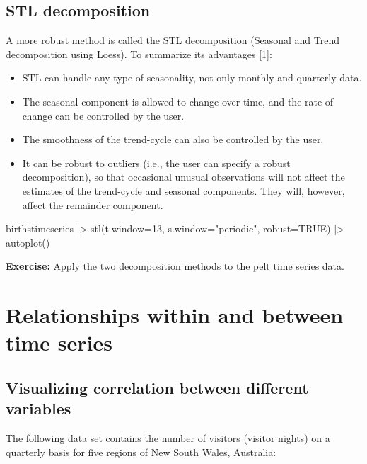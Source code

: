 \documentclass[
  letterpaper,
  DIV=11,
  numbers=noendperiod]{scrreprt}
\newenvironment{Shaded}{\begin{snugshade}}{\end{snugshade}}
\newcommand{\NormalTok}[1]{\textcolor[rgb]{0.00,0.23,0.31}{#1}}
\providecommand{\tightlist}{%
  \setlength{\itemsep}{0pt}\setlength{\parskip}{0pt}}\usepackage{longtable,booktabs,array}
\begin{document}
\subsection{STL decomposition}\label{stl-decomposition}

A more robust method is called the STL decomposition (Seasonal and Trend
decomposition using Loess). To summarize its advantages {[}1{]}:

\begin{itemize}
\tightlist
\item
  STL can handle any type of seasonality, not only monthly and quarterly
  data.
\item
  The seasonal component is allowed to change over time, and the rate of
  change can be controlled by the user.
\item
  The smoothness of the trend-cycle can also be controlled by the user.
\item
  It can be robust to outliers (i.e., the user can specify a robust
  decomposition), so that occasional unusual observations will not
  affect the estimates of the trend-cycle and seasonal components. They
  will, however, affect the remainder component.
\end{itemize}

\begin{Shaded}
\begin{Highlighting}[]
\NormalTok{birthstimeseries |\textgreater{}  stl(t.window=13, s.window="periodic", robust=TRUE) |\textgreater{}}
\NormalTok{  autoplot()}
\end{Highlighting}
\end{Shaded}

\textbf{Exercise:} Apply the two decomposition methods to the pelt time
series data.

\section{Relationships within and between time
series}\label{relationships-within-and-between-time-series}

\subsection{Visualizing correlation between different
variables}\label{visualizing-correlation-between-different-variables}

The following data set contains the number of visitors (visitor nights)
on a quarterly basis for five regions of New South Wales, Australia:
\end{document}
